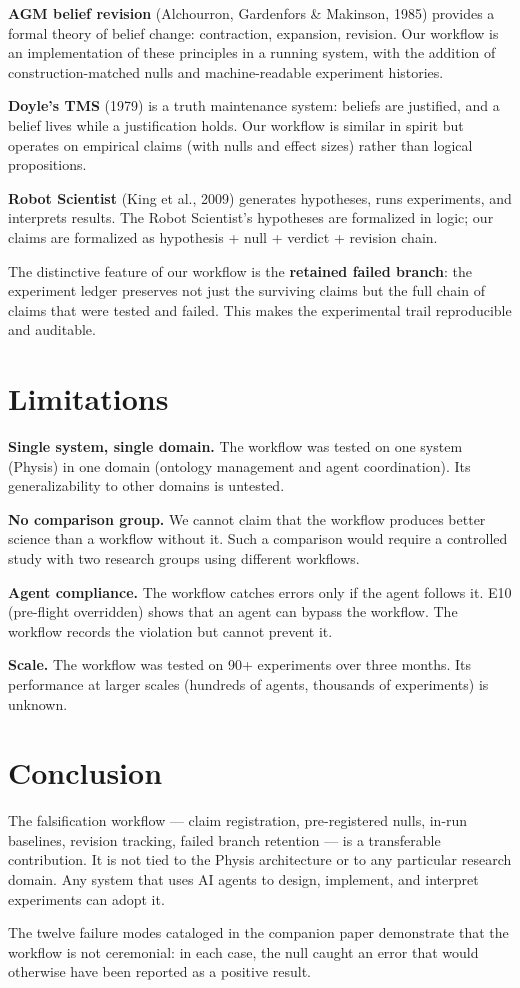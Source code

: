 \documentclass[11pt]{article}
\begin{document}
\textbf{AGM belief revision} (Alchourron, Gardenfors \& Makinson, 1985)
provides a formal theory of belief change: contraction, expansion,
revision. Our workflow is an implementation of these principles in a
running system, with the addition of construction-matched nulls and
machine-readable experiment histories.

\textbf{Doyle's TMS} (1979) is a truth maintenance system: beliefs are
justified, and a belief lives while a justification holds. Our workflow
is similar in spirit but operates on empirical claims (with nulls and
effect sizes) rather than logical propositions.

\textbf{Robot Scientist} (King et al., 2009) generates hypotheses,
runs experiments, and interprets results. The Robot Scientist's
hypotheses are formalized in logic; our claims are formalized as
hypothesis + null + verdict + revision chain.

The distinctive feature of our workflow is the \textbf{retained failed
branch}: the experiment ledger preserves not just the surviving claims
but the full chain of claims that were tested and failed. This makes the
experimental trail reproducible and auditable.

\section{Limitations}

\textbf{Single system, single domain.} The workflow was tested on one
system (Physis) in one domain (ontology management and agent
coordination). Its generalizability to other domains is untested.

\textbf{No comparison group.} We cannot claim that the workflow
produces better science than a workflow without it. Such a comparison
would require a controlled study with two research groups using
different workflows.

\textbf{Agent compliance.} The workflow catches errors only if the agent
follows it. E10 (pre-flight overridden) shows that an agent can bypass
the workflow. The workflow records the violation but cannot prevent it.

\textbf{Scale.} The workflow was tested on 90+ experiments over three
months. Its performance at larger scales (hundreds of agents, thousands
of experiments) is unknown.

\section{Conclusion}

The falsification workflow --- claim registration, pre-registered nulls,
in-run baselines, revision tracking, failed branch retention --- is a
transferable contribution. It is not tied to the Physis architecture or
to any particular research domain. Any system that uses AI agents to
design, implement, and interpret experiments can adopt it.

The twelve failure modes cataloged in the companion paper demonstrate
that the workflow is not ceremonial: in each case, the null caught an
error that would otherwise have been reported as a positive result.
\end{document}
